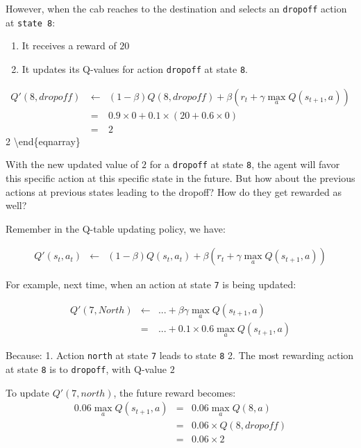 \documentclass[
  letterpaper,
]{scrbook}
\providecommand{\tightlist}{%
  \setlength{\itemsep}{0pt}\setlength{\parskip}{0pt}}
\begin{document}
However, when the cab reaches to the destination and selects an
\texttt{dropoff} action at \texttt{state\ 8}:

\begin{enumerate}
\def\labelenumi{\arabic{enumi}.}
\tightlist
\item
  It receives a reward of \(20\)
\item
  It updates its Q-values for action \texttt{dropoff} at state
  \texttt{8}.
\end{enumerate}

\begin{eqnarray}
Q'(8, dropoff) \
& \leftarrow & (1-\beta) Q(8, dropoff) + \beta (r_t + \gamma \max_a{Q(s_{t+1},a)}) \\
         & = & 0.9 \times 0 + 0.1\times(20 + 0.6\times 0)\\
         & = & 2
\end{eqnarray} 2 \textbackslash end\{eqnarray\}

With the new updated value of \(2\) for a \texttt{dropoff} at state
\texttt{8}, the agent will favor this specific action at this specific
state in the future. But how about the previous actions at previous
states leading to the dropoff? How do they get rewarded as well?

Remember in the Q-table updating policy, we have:

\begin{eqnarray}
Q'(s_t, a_t) & \leftarrow & (1-\beta) Q(s_t, a_t) + \beta (r_t + \gamma \max_a{Q(s_{t+1},a)}) 
\end{eqnarray}

For example, next time, when an action at state \texttt{7} is being
updated:

\begin{eqnarray}
Q'(7, North) 
& \leftarrow & ... + \beta \gamma \max_a{Q(s_{t+1}, a)} \\
         & = & ... + 0.1\times0.6 \max_a{Q(s_{t+1}, a)}
\end{eqnarray}

Because: 1. Action \texttt{north} at state \texttt{7} leads to state
\texttt{8} 2. The most rewarding action at state \texttt{8} is to
\texttt{dropoff}, with Q-value \(2\)

To update \(Q'(7, north)\), the future reward becomes: \begin{eqnarray}
0.06 \max_a{Q(s_{t+1}, a)} 
& = & 0.06 \max_a{Q(8,a)} \\
& = & 0.06 \times Q(8, dropoff) \\
& = & 0.06 \times 2
\end{eqnarray}
\end{document}
